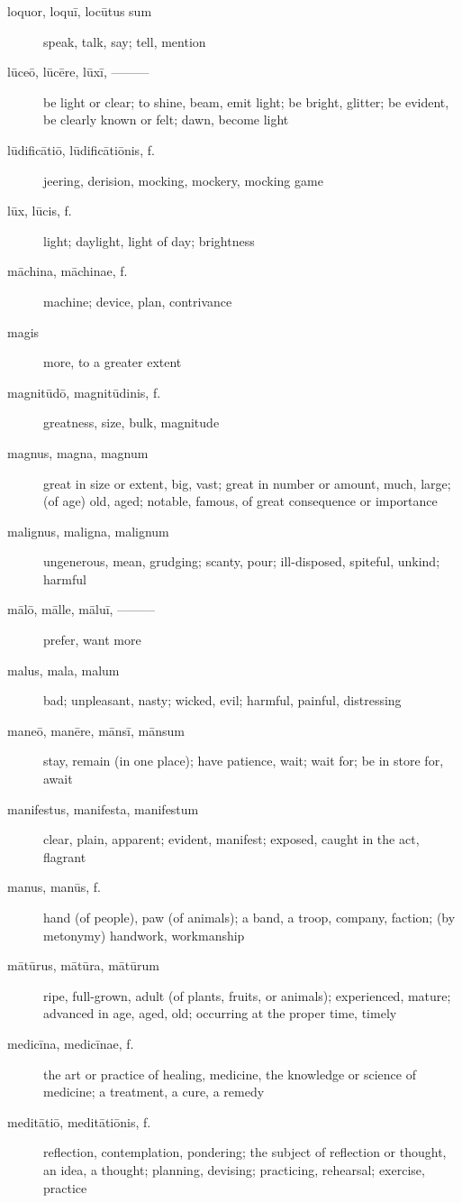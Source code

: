 \begin{description}
    \item[loquor, loquī, locūtus sum] \marginnote{*}speak, talk, say; tell, mention
    \item[lūceō, lūcēre, lūxī, ———] be light or clear; to shine, beam, emit light; be bright, glitter; be evident, be clearly known or felt; dawn, become light
    \item[lūdificātiō, lūdificātiōnis, f.] jeering, derision, mocking, mockery, mocking game
    \item[lūx, lūcis, f.] \marginnote{*}light; daylight, light of day; brightness
    \item[māchina, māchinae, f.] machine; device, plan, contrivance
    \item[magis] \marginnote{*}more, to a greater extent
    \item[magnitūdō, magnitūdinis, f.] \marginnote{*}greatness, size, bulk, magnitude
    \item[magnus, magna, magnum] \marginnote{*}great in size or extent, big, vast; great in number or amount, much, large; (of age) old, aged; notable, famous, of great consequence or importance
    \item[malignus, maligna, malignum] ungenerous, mean, grudging; scanty, pour; ill-disposed, spiteful, unkind; harmful
    \item[mālō, mālle, māluī, ———] \marginnote{*}prefer, want more
    \item[malus, mala, malum] \marginnote{*}bad; unpleasant, nasty; wicked, evil; harmful, painful, distressing
    \item[maneō, manēre, mānsī, mānsum] \marginnote{*}stay, remain (in one place); have patience, wait; wait for; be in store for, await
    \item[manifestus, manifesta, manifestum] clear, plain, apparent; evident, manifest; exposed, caught in the act, flagrant
    \item[manus, manūs, f.] \marginnote{*}hand (of people), paw (of animals); a band, a troop, company, faction; (by metonymy) handwork, workmanship
    \item[mātūrus, mātūra, mātūrum] ripe, full-grown, adult (of plants, fruits, or animals); experienced, mature; advanced in age, aged, old; occurring at the proper time, timely
    \item[medicīna, medicīnae, f.] the art or practice of healing, medicine, the knowledge or science of medicine; a treatment, a cure, a remedy
    \item[meditātiō, meditātiōnis, f.] \marginnote{*}reflection, contemplation, pondering; the subject of reflection or thought, an idea, a thought; planning, devising; practicing, rehearsal; exercise, practice

\end{description}
